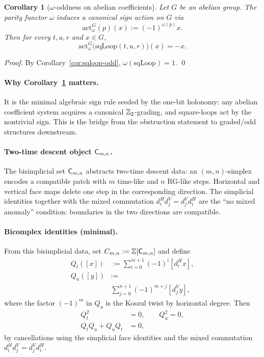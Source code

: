\documentclass[aps,prl,reprint,floatfix]{revtex4-2}
\theoremstyle{plain}
\newtheorem{corollary}{Corollary}
\theoremstyle{definition}
\begin{document}
\begin{corollary}[$\omega$-oddness on abelian coefficients]
\label{cor:omega-odd-abelian-prl}
Let $G$ be an abelian group. The parity functor $\omega$ induces a canonical sign action on $G$ via
\[
\mathrm{act}^G_{\omega}(p)(x):=(-1)^{\omega(p)}x.
\]
Then for every $t,u,r$ and $x\in G$,
\[
\mathrm{act}^G_{\omega}\big(\mathrm{sqLoop}(t,u,r)\big)(x)=-x.
\]
\end{corollary}

\noindent\emph{Proof.}
By Corollary~\ref{cor:sqloop-odd}, $\omega(\mathrm{sqLoop})=1$. \qed

\paragraph{Why Corollary~\ref{cor:omega-odd-abelian-prl} matters.}
It is the minimal algebraic sign rule seeded by the one-bit holonomy: any abelian coefficient system acquires a canonical $\mathbb{Z}_2$-grading,
and square-loops act by the nontrivial sign. This is the bridge from the obstruction statement to graded/odd structures downstream.

\paragraph{Two-time descent object $\mathsf{C}_{m,n}$.}
The bisimplicial set $\mathsf{C}_{m,n}$ abstracts two-time descent data: an $(m,n)$-simplex encodes a compatible patch with $m$ time-like and $n$ RG-like steps.
Horizontal and vertical face maps delete one step in the corresponding direction.
The simplicial identities together with the mixed commutation $d_i^H d_j^V=d_j^V d_i^H$ are the ``no mixed anomaly'' condition: boundaries in the two directions are compatible.

\paragraph{Bicomplex identities (minimal).}
From this bisimplicial data, set $C_{m,n}:=\mathbb Z[\mathsf{C}_{m,n}]$ and define
\begin{align}
Q_t([x])&:=\sum_{i=0}^{m+1}(-1)^i[d_i^H x], \\
Q_u([y])&:= {}\\
&\sum_{j=0}^{n+1}(-1)^{m+j}[d_j^V y],
\label{eq:QtQu}
\end{align}
where the factor $(-1)^m$ in $Q_u$ is the Koszul twist by horizontal degree. Then
\begin{equation}
\begin{aligned}
Q_t^2&=0,\qquad Q_u^2=0,\\
Q_tQ_u+Q_uQ_t&=0,
\end{aligned}
\label{eq:bicomplex}
\end{equation}
by cancellations using the simplicial face identities and the mixed commutation $d_i^H d_j^V=d_j^V d_i^H$.
\end{document}
